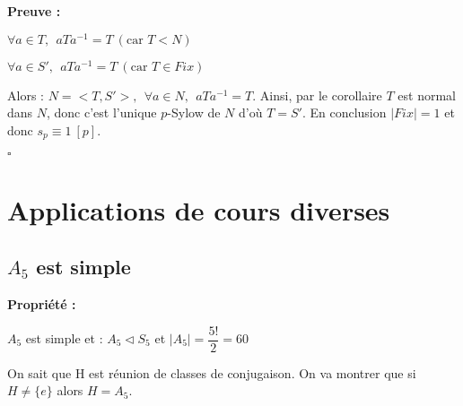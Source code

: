 \documentclass{report}
\renewenvironment{leftbar}{%
  \def\FrameCommand{\vrule width 0.4pt \hspace{10pt}}%
  \MakeFramed {\advance\hsize-\width \FrameRestore}}%
 {\endMakeFramed}%
\newenvironment{preuve}{\vspace*{0.5cm}
    \begin{leftbar}
    \noindent\textbf{Preuve :}\par}{
    \begin{flushright}
    $\square$
    \end{flushright}
    \end{leftbar}
}
\newenvironment{prop}{\begin{tcolorbox}[colframe= white]
    \textbf{Propriété :}
     \par}
    {\end{tcolorbox}}
\begin{document}
\begin{preuve}
            \begin{center}
                $\forall a \in T, ~~aTa^{-1}=T~(\text{car }T<N)$ 
            \end{center}
            \begin{center}
            	$\forall a \in S', ~~aTa^{-1}=T~(\text{car }T\in Fix)$
            \end{center}
            Alors : $N = <T,S'>, ~~\forall a \in N,~~aTa^{-1}=T$. Ainsi, par le corollaire $T$ est normal dans $N$, donc c'est l'unique $p$-Sylow de $N$ d'où $T =S'$. En conclusion $|Fix| = 1$ et  donc $s_p \equiv 1 ~[p]$. 
            
        \end{preuve}

\chapter{Applications de cours diverses}

\section{$A_{5}$ est simple}


\begin{prop}
$A_{5}$ est simple et : $A_{5} \triangleleft S_{5}$ et $|A_{5}| = \dfrac{5!}{2}=60$
\end{prop}

On sait que H est réunion de classes de conjugaison. On va montrer que si $H \neq \{e\}$ alors $H=A_{5}$.\par 
\end{document}
